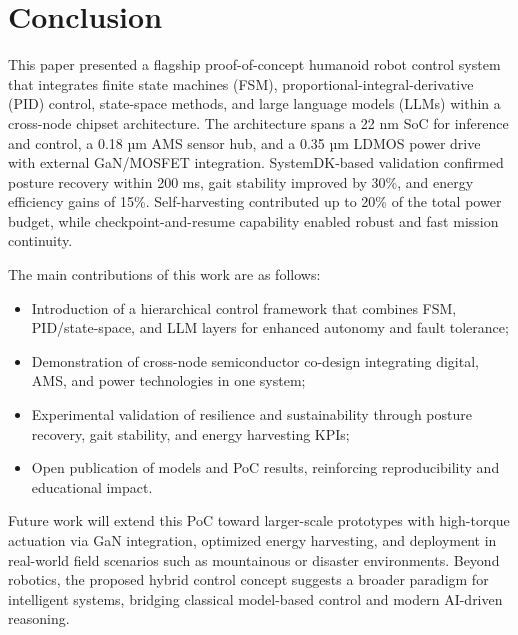 \section{Conclusion}
This paper presented a flagship proof-of-concept humanoid robot control system
that integrates finite state machines (FSM), proportional-integral-derivative (PID) control,
state-space methods, and large language models (LLMs) within a cross-node chipset architecture.
The architecture spans a 22 nm SoC for inference and control, a 0.18 µm AMS sensor hub,
and a 0.35 µm LDMOS power drive with external GaN/MOSFET integration.
SystemDK-based validation confirmed posture recovery within 200 ms,
gait stability improved by 30\%, and energy efficiency gains of 15\%.
Self-harvesting contributed up to 20\% of the total power budget,
while checkpoint-and-resume capability enabled robust and fast mission continuity.

The main contributions of this work are as follows:
\begin{itemize}
  \item Introduction of a hierarchical control framework
        that combines FSM, PID/state-space, and LLM layers
        for enhanced autonomy and fault tolerance;
  \item Demonstration of cross-node semiconductor co-design
        integrating digital, AMS, and power technologies in one system;
  \item Experimental validation of resilience and sustainability
        through posture recovery, gait stability, and energy harvesting KPIs;
  \item Open publication of models and PoC results,
        reinforcing reproducibility and educational impact.
\end{itemize}

Future work will extend this PoC toward larger-scale prototypes
with high-torque actuation via GaN integration, optimized energy harvesting,
and deployment in real-world field scenarios such as mountainous
or disaster environments.
Beyond robotics, the proposed hybrid control concept suggests
a broader paradigm for intelligent systems,
bridging classical model-based control and modern AI-driven reasoning.
